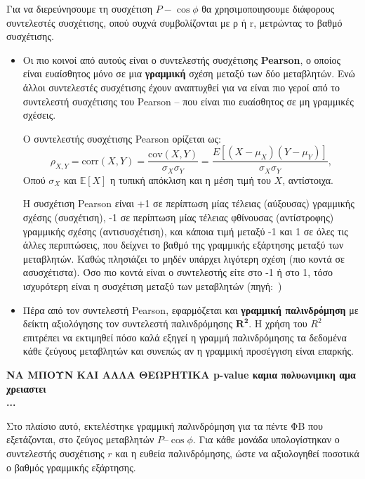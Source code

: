 Για να διερεύνησουμε τη  συσχέτιση $P-\cos\phi$  θα χρησιμοποιησουμε  διάφορους συντελεστές συσχέτισης, οπού συχνά συμβολίζονται με ρ ή \textlatin{r}, μετρώντας το βαθμό συσχέτισης.
\begin{itemize}
\item Οι πιο κοινοί από αυτούς είναι ο συντελεστής συσχέτισης \textbf{\textlatin{Pearson}}, ο οποίος είναι ευαίσθητος μόνο σε μια \textbf{γραμμική} σχέση μεταξύ των δύο μεταβλητών. Ενώ άλλοι συντελεστές συσχέτισης έχουν αναπτυχθεί για να είναι πιο γεροί από το συντελεστή συσχέτισης του \textlatin{Pearson} -- που είναι πιο ευαίσθητος σε μη γραμμικές σχέσεις.

Ο συντελεστής συσχέτισης \textlatin{Pearson} ορίζεται ως:
\begin{equation}
\rho_{X,Y}=\mathrm{corr}(X,Y)=\frac{\mathrm{cov}(X,Y)}{\sigma_X\sigma_Y}
=\frac{E\!\left[(X-\mu_X)(Y-\mu_Y)\right]}{\sigma_X\sigma_Y},
\end{equation}
Οπού $\sigma_X$ και $\mathbb{E}[X]$ η τυπική απόκλιση και η μέση τιμή του $X$, αντίστοιχα.\par Η συσχέτιση \textlatin{Pearson} είναι +1 σε περίπτωση μίας τέλειας (αύξουσας) γραμμικής σχέσης (συσχέτιση), -1 σε περίπτωση μίας τέλειας φθίνουσας (αντίστροφης) γραμμικής σχέσης (αντισυσχέτιση), και κάποια τιμή μεταξύ -1 και 1 σε όλες τις άλλες περιπτώσεις, που δείχνει το βαθμό της γραμμικής εξάρτησης μεταξύ των μεταβλητών. Καθώς πλησιάζει το μηδέν υπάρχει λιγότερη  σχέση (πιο κοντά σε ασυσχέτιστα). Όσο πιο κοντά είναι ο συντελεστής είτε στο -1 ή στο 1, τόσο ισχυρότερη είναι η συσχέτιση μεταξύ των μεταβλητών
(πηγή:~\cite{wikipedia-correlation-dependence})

\item Πέρα από  τον συντελεστή \textlatin{Pearson}, εφαρμόζεται και \textbf{γραμμική παλινδρόμηση} με δείκτη αξιολόγησης τον συντελεστή παλινδρόμησης $\mathbf{R^2}$. Η χρήση του $R^2$ επιτρέπει να εκτιμηθεί πόσο καλά εξηγεί η γραμμή παλινδρόμησης τα δεδομένα κάθε ζεύγους μεταβλητών και συνεπώς αν η γραμμική προσέγγιση είναι επαρκής.
\end{itemize}

\begin{center}
\textbf{ΝΑ ΜΠΟΥΝ ΚΑΙ ΑΛΛΑ ΘΕΩΡΗΤΙΚΑ \textlatin{p-value} καμια πολυωνιμικη αμα χρειαστει\\ ...}
\end{center}

\newpage Στο πλαίσιο αυτό, εκτελέστηκε γραμμική παλινδρόμηση για τα πέντε ΦΒ που εξετάζονται, στο ζεύγος μεταβλητών $P$--$\cos\phi$. Για κάθε μονάδα υπολογίστηκαν ο συντελεστής συσχέτισης $r$ και  η ευθεία παλινδρόμησης, ώστε να αξιολογηθεί ποσοτικά ο βαθμός γραμμικής εξάρτησης.

